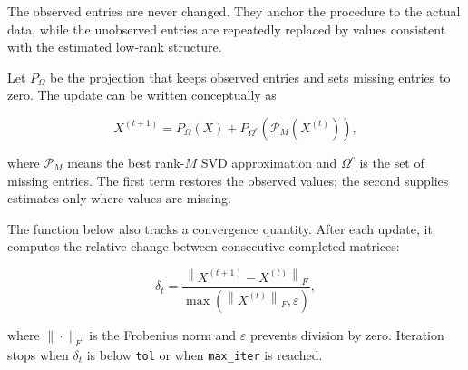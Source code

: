 \documentclass[
  11pt,
]{article}
\begin{document}
The observed entries are never changed. They anchor the procedure to the
actual data, while the unobserved entries are repeatedly replaced by
values consistent with the estimated low-rank structure.

Let \(P_\Omega\) be the projection that keeps observed entries and sets
missing entries to zero. The update can be written conceptually as

\[
X^{(t+1)}
= P_\Omega(X) + P_{\Omega^c}\left(\mathcal{P}_M(X^{(t)})\right),
\]

where \(\mathcal{P}_M\) means the best rank-\(M\) SVD approximation and
\(\Omega^c\) is the set of missing entries. The first term restores the
observed values; the second supplies estimates only where values are
missing.

The function below also tracks a convergence quantity. After each
update, it computes the relative change between consecutive completed
matrices:

\[
\delta_t =
\frac{\left\|X^{(t+1)}-X^{(t)}\right\|_F}
{\max\left(\left\|X^{(t)}\right\|_F,\varepsilon\right)},
\]

where \(\|\cdot\|_F\) is the Frobenius norm and \(\varepsilon\) prevents
division by zero. Iteration stops when \(\delta_t\) is below
\texttt{tol} or when \texttt{max\_iter} is reached.
\end{document}
